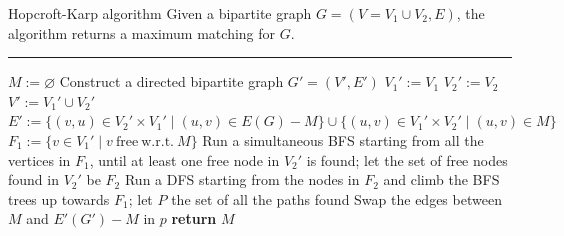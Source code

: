 \documentclass[a4paper, 12pt]{report}
\begin{document}
    \begin{framedalgo}{Hopcroft-Karp algorithm}
        Given a bipartite graph $G = (V = V_1 \cup V_2, E)$, the algorithm returns a maximum matching for $G$. \\
        \hrule

        \quad
        \begin{algorithmic}[1]
                \State $M := \varnothing$
                \State Construct a directed bipartite graph $G' = (V', E')$
                \State $V_1' := V_1$
                \State $V_2' := V_2$
                \State $V' := V_1' \cup V_2'$
                \State $E' := \{(v, u) \in V_2' \times V_1' \mid (u, v) \in E(G) - M\} \cup \{(u, v) \in V_1' \times V_2' \mid (u, v) \in M\}$
                \State $F_1 := \{v \in V_1' \mid v \mathrm{\ free \ w.r.t. \ } M\}$
                \Do
                    \State Run a simultaneous BFS starting from all the vertices in $F_1$, until at least one free node in $V_2'$ is found; let the set of free nodes found in $V_2'$ be $F_2$
                    \State Run a DFS starting from the nodes in $F_2$ and climb the BFS trees up towards $F_1$; let $P$ the set of all the paths found
                        \State Swap the edges between $M$ and $E'(G') - M$ in $p$
                    \EndFor
                \State \textbf{return} $M$
            \EndFunction
        \end{algorithmic}
    \end{framedalgo}
\end{document}
